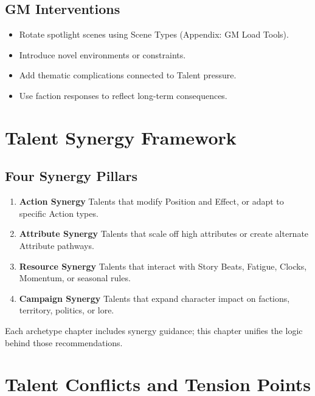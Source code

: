 \documentclass[11pt]{book}
\begin{document}
\subsection{GM Interventions}

\begin{itemize}
    \item Rotate spotlight scenes using Scene Types (Appendix: GM Load Tools).
    \item Introduce novel environments or constraints.
    \item Add thematic complications connected to Talent pressure.
    \item Use faction responses to reflect long-term consequences.
\end{itemize}

\section{Talent Synergy Framework}

\subsection{Four Synergy Pillars}

\begin{enumerate}
    \item \textbf{Action Synergy}  
    Talents that modify Position and Effect, or adapt to specific Action types.

    \item \textbf{Attribute Synergy}  
    Talents that scale off high attributes or create alternate Attribute pathways.

    \item \textbf{Resource Synergy}  
    Talents that interact with Story Beats, Fatigue, Clocks, Momentum, or seasonal rules.

    \item \textbf{Campaign Synergy}  
    Talents that expand character impact on factions, territory, politics, or lore.
\end{enumerate}

Each archetype chapter includes synergy guidance;
this chapter unifies the logic behind those recommendations.

\section{Talent Conflicts and Tension Points}
\end{document}

